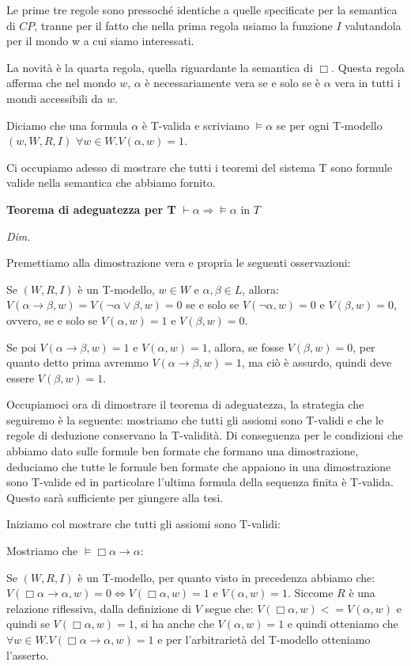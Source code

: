 \documentclass[a4paper, titlepage, 12pt]{report}
\begin{document}
Le prime tre regole sono pressoché identiche a quelle specificate per la semantica di $CP$,
tranne per il fatto che nella prima regola usiamo la funzione $I$ valutandola per il mondo w
a cui siamo interessati.

La novità è la quarta regola, quella riguardante la semantica di $\Box$.
Questa regola afferma che nel mondo $w$, $\alpha$ è necessariamente vera se e solo se
è $\alpha$ vera in tutti i mondi accessibili da $w$.

Diciamo che una formula $\alpha$ è T-valida e scriviamo $\vDash \alpha$
se per ogni T-modello $(w, W, R, I)$ $\forall w \in W. V(\alpha, w) = 1$.

Ci occupiamo adesso di mostrare che tutti i teoremi del sistema T sono formule valide
nella semantica che abbiamo fornito.

\begin{flushleft}
\textbf{Teorema di adeguatezza per T}
$\vdash \alpha \Rightarrow \vDash \alpha$ in $T$

\textit{Dim.}

Premettiamo alla dimostrazione vera e propria le seguenti osservazioni:

Se $(W, R, I)$ è un T-modello, $w \in W$ e $\alpha, \beta \in L$, allora:
$V(\alpha \rightarrow \beta, w) = V(\neg \alpha \lor \beta, w) = 0$ se e solo se
$V(\neg \alpha, w) = 0$ e $V(\beta, w) = 0$, ovvero, se e solo se $V(\alpha, w) = 1$ e $V(\beta, w) = 0$.

Se poi $V(\alpha \rightarrow \beta, w) = 1$ e $V(\alpha, w) = 1$, allora, se fosse
$V(\beta, w) = 0$, per quanto detto prima avremmo $V(\alpha \rightarrow \beta, w) = 1$, ma ciò
è assurdo, quindi deve essere $V(\beta, w) = 1$.

Occupiamoci ora di dimostrare il teorema di adeguatezza, la strategia che seguiremo è la seguente:
mostriamo che tutti gli assiomi sono T-validi e che le regole di deduzione conservano la T-validità.
Di conseguenza per le condizioni che abbiamo dato sulle formule ben formate che formano una dimostrazione,
deduciamo che tutte le formule ben formate che appaiono in una dimostrazione sono T-valide
ed in particolare l'ultima formula della sequenza finita è T-valida.
Questo sarà sufficiente per giungere alla tesi.

Iniziamo col mostrare che tutti gli assiomi sono T-validi:

Mostriamo che $\vDash \Box \alpha \rightarrow \alpha$:

Se $(W, R, I)$ è un T-modello, per quanto visto in precedenza abbiamo che:
$V(\Box \alpha \rightarrow \alpha, w) = 0 \Leftrightarrow V(\Box \alpha, w) = 1$ e $V(\alpha, w) = 1$.
Siccome $R$ è una relazione riflessiva, dalla definizione di $V$ segue che:
$V(\Box \alpha, w) <= V(\alpha, w)$ e quindi se $V(\Box \alpha, w) = 1$, si ha anche che
$V(\alpha, w) = 1$ e quindi otteniamo che
$\forall w \in W. V(\Box \alpha \rightarrow \alpha, w) = 1$ e per l'arbitrarietà
del T-modello otteniamo l'asserto.


\end{flushleft}
\end{document}
